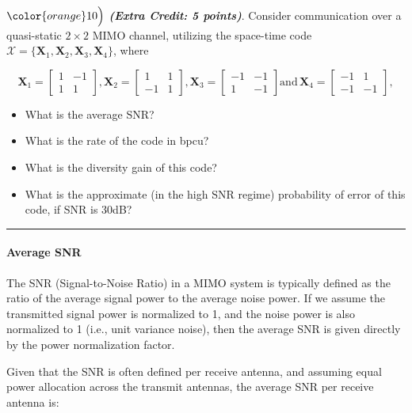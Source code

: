 \documentclass[11pt]{article}
\providecommand{\tightlist}{%
      \setlength{\itemsep}{0pt}\setlength{\parskip}{0pt}}
\begin{document}
    \(\color{orange}10\Bigl)\) \textbf{\emph{(Extra Credit: 5 points)}}.
Consider communication over a quasi-static \(2 \times 2\) MIMO channel,
utilizing the space-time code
\(\mathcal{X} = \{\mathbf{X}_1,\mathbf{X}_2,\mathbf{X}_3,\mathbf{X}_4\}\),
where

\[
\mathbf{X}_1 =
\begin{bmatrix}
  1 & -1 \\
  1 & 1
\end{bmatrix},
\mathbf{X}_2 =
\begin{bmatrix}
  1 & 1 \\
  -1 & 1
\end{bmatrix},
\mathbf{X}_3 =
\begin{bmatrix}
  -1 & -1 \\
  1 & -1
\end{bmatrix}
\text{and} \,
\mathbf{X}_4 =
\begin{bmatrix}
  -1 & 1 \\
  -1 & -1
\end{bmatrix},
\]

\begin{itemize}
\tightlist
\item
  What is the average SNR?
\item
  What is the rate of the code in bpcu?
\item
  What is the diversity gain of this code?
\item
  What is the approximate (in the high SNR regime) probability of error
  of this code, if SNR is 30dB?
\end{itemize}

    \begin{center}\rule{0.5\linewidth}{0.5pt}\end{center}

\paragraph{Average SNR}\label{average-snr}

The SNR (Signal-to-Noise Ratio) in a MIMO system is typically defined as
the ratio of the average signal power to the average noise power. If we
assume the transmitted signal power is normalized to 1, and the noise
power is also normalized to 1 (i.e., unit variance noise), then the
average SNR is given directly by the power normalization factor.

Given that the SNR is often defined per receive antenna, and assuming
equal power allocation across the transmit antennas, the average SNR per
receive antenna is:
\end{document}
